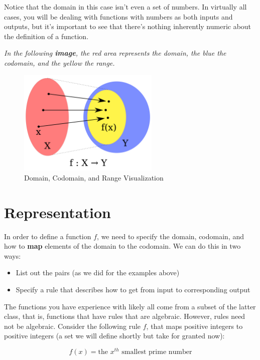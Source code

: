 \documentclass{article}
\begin{document}
Notice that the domain in this case isn't even a set of numbers. In virtually all cases, you will be dealing with functions with numbers as both inputs and outputs, but it's important to see that there's nothing inherently numeric about the definition of a function.

\textit{In the following \textbf{image}, the red area represents the domain, the blue the codomain, and the yellow the range.}

\begin{figure}[h]
\centering
\includegraphics[width=0.6\textwidth]{./images/Codomain.png}
\caption{Domain, Codomain, and Range Visualization}
\label{fig:domain_codomain}
\end{figure}

\section{Representation}

In order to define a function $f$, we need to specify the domain, codomain, and how to \textbf{map} elements of the domain to the codomain. We can do this in two ways:
\begin{itemize}
    \item List out the pairs (as we did for the examples above)
    \item Specify a rule that describes how to get from input to corresponding output
\end{itemize}

The functions you have experience with likely all come from a subset of the latter class, that is, functions that have rules that are algebraic. However, rules need not be algebraic. Consider the following rule $f$, that maps positive integers to positive integers (a set we will define shortly but take for granted now):

\[f(x) = \text{the } x^{th} \text{ smallest prime number}\]
\end{document}
